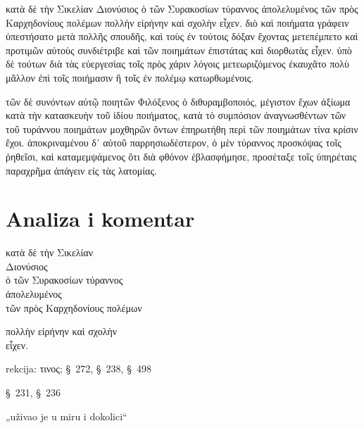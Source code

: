 {\large

\begin{greek}

\noindent κατὰ δὲ τὴν Σικελίαν Διονύσιος ὁ τῶν Συρακοσίων τύραννος ἀπολελυμένος τῶν πρὸς Καρχηδονίους πολέμων πολλὴν εἰρήνην καὶ σχολὴν εἶχεν. διὸ καὶ ποιήματα γράφειν ὑπεστήσατο μετὰ πολλῆς σπουδῆς, καὶ τοὺς ἐν τούτοις δόξαν ἔχοντας μετεπέμπετο καὶ προτιμῶν αὐτοὺς συνδιέτριβε καὶ τῶν ποιημάτων ἐπιστάτας καὶ διορθωτὰς εἶχεν. ὑπὸ δὲ τούτων διὰ τὰς εὐεργεσίας τοῖς πρὸς χάριν λόγοις μετεωριζόμενος ἐκαυχᾶτο πολὺ μᾶλλον ἐπὶ τοῖς ποιήμασιν ἢ τοῖς ἐν πολέμῳ κατωρθωμένοις.

τῶν δὲ συνόντων αὐτῷ ποιητῶν Φιλόξενος ὁ διθυραμβοποιός, μέγιστον ἔχων ἀξίωμα κατὰ τὴν κατασκευὴν τοῦ ἰδίου ποιήματος, κατὰ τὸ συμπόσιον ἀναγνωσθέντων τῶν τοῦ τυράννου ποιημάτων μοχθηρῶν ὄντων ἐπηρωτήθη περὶ τῶν ποιημάτων τίνα κρίσιν ἔχοι. ἀποκριναμένου δ᾽ αὐτοῦ παρρησιωδέστερον, ὁ μὲν τύραννος προσκόψας τοῖς ῥηθεῖσι, καὶ καταμεμψάμενος ὅτι διὰ φθόνον ἐβλασφήμησε, προσέταξε τοῖς ὑπηρέταις παραχρῆμα ἀπάγειν εἰς τὰς λατομίας.

\end{greek}

}


\section*{Analiza i komentar}



{\large
\begin{greek}
\noindent κατὰ δὲ τὴν Σικελίαν \\
Διονύσιος \\
\tabto{2em} ὁ τῶν Συρακοσίων τύραννος \\
\tabto{2em} ἀπολελυμένος \\
\tabto{4em} τῶν πρὸς Καρχηδονίους πολέμων

πολλὴν εἰρήνην καὶ σχολὴν \\
εἶχεν.\\

\end{greek}
}

\begin{description}[noitemsep]
\item[ἀπολελυμένος] rekcija: τινος; §~272, §~238, §~498
\item[εἶχεν] §~231, §~236
\item[εἰρήνην καὶ σχολὴν εἶχεν] „uživao je u miru i dokolici“

\end{description}


